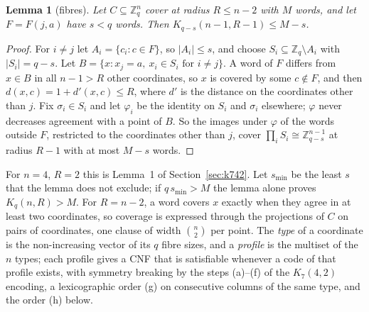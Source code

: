 \documentclass[11pt]{amsart}
\newtheorem{lemma}[theorem]{Lemma}
\theoremstyle{definition}
\theoremstyle{remark}
\begin{document}
\begin{lemma}[fibres]\label{lem:fibre}
Let $C\subseteq\mathbb{Z}_q^n$ cover at radius $R\le n-2$ with $M$ words, and let $F=F(j,a)$ have $s<q$ words. Then $K_{q-s}(n-1,R-1)\le M-s$.
\end{lemma}
\begin{proof}
For $i\ne j$ let $A_i=\{c_i:c\in F\}$, so $|A_i|\le s$, and choose $S_i\subseteq\mathbb{Z}_q\setminus A_i$ with $|S_i|=q-s$. Let $B=\{x: x_j=a,\ x_i\in S_i \text{ for } i\ne j\}$. A word of $F$ differs from $x\in B$ in all $n-1>R$ other coordinates, so $x$ is covered by some $c\notin F$, and then $d(x,c)=1+d'(x,c)\le R$, where $d'$ is the distance on the coordinates other than $j$. Fix $\sigma_i\in S_i$ and let $\varphi_i$ be the identity on $S_i$ and $\sigma_i$ elsewhere; $\varphi$ never decreases agreement with a point of $B$. So the images under $\varphi$ of the words outside $F$, restricted to the coordinates other than $j$, cover $\prod_i S_i\cong\mathbb{Z}_{q-s}^{n-1}$ at radius $R-1$ with at most $M-s$ words.
\end{proof}
For $n=4$, $R=2$ this is Lemma~1 of Section~\ref{sec:k742}. Let $s_{\min}$ be the least $s$ that the lemma does not exclude; if $q\,s_{\min}>M$ the lemma alone proves $K_q(n,R)>M$.
For $R=n-2$, a word covers $x$ exactly when they agree in at least two coordinates, so coverage is expressed through the projections of $C$ on pairs of coordinates, one clause of width $\binom n2$ per point.
The \emph{type} of a coordinate is the non-increasing vector of its $q$ fibre sizes, and a \emph{profile} is the multiset of the $n$ types; each profile gives a CNF that is satisfiable whenever a code of that profile exists, with symmetry breaking by the steps (a)--(f) of the $K_7(4,2)$ encoding, a lexicographic order (g) on consecutive columns of the same type, and the order (h) below.
\end{document}
